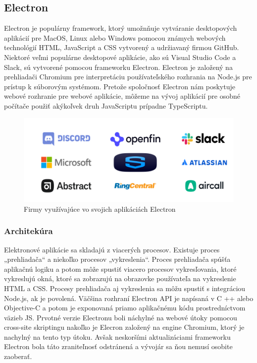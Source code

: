 \subsection{Electron}
\indent Electron je populárny framework, ktorý umožnňuje vytváranie desktopových aplikácií pre MacOS, Linux alebo Windows pomocou známych webových technológií HTML, JavaScript a CSS vytvorený a udržiavaný firmou GitHub. Niektoré veľmi populárne desktopové aplikácie, ako sú Visual Studio Code a Slack, sú vytvorené pomocou frameworku Electron. Electron je založený na prehliadači Chromium pre interpretáciu používateľského rozhrania na Node.js pre prístup k súborovým systémom. Pretože spoločnosť Electron nám poskytuje webové rozhranie pre webové aplikácie, môžeme na vývoj aplikácií pre osobné počítače použiť akýkoľvek druh JavaScriptu prípadne TypeScriptu.

\begin{figure}[H]
    \centering
    \includegraphics[scale=0.45]{img/electron_aps.png}
    \caption{Firmy využívajúce vo svojich aplikáciách Electron}
    \label{fig:electron_aps}
\end{figure}

\subsubsection{Architekúra}
\indent Elektronové aplikácie sa skladajú z viacerých procesov. Existuje proces „prehliadača“ a niekoľko procesov „vykreslenia“. Proces prehliadača spúšťa aplikačnú logiku a potom môže spustiť viacero procesov vykresľovania, ktoré vykreslujú okná, ktoré sa zobrazujú na obrazovke používateľa na vykreslenie HTML a CSS. Procesy prehliadača aj vykreslenia sa môžu spustiť s integráciou Node.js, ak je povolená.
\indent Väčšina rozhraní Electron API je napísaná v C ++ alebo Objective-C a potom je exponovaná priamo aplikačnému kódu prostredníctvom väzieb JS. Prvotné verzie Electronu boli náchylné na webové útoky pomocou cross-site skriptingu nakoľko je Elecron založený na engine Chromium, ktorý je nachylný na tento typ útoku. Avšak neskoršími aktualizáciami frameworku Electron bola táto zraniteľnosť odstránená a vývojár sa ňou nemusí osobite zaoberať. 



